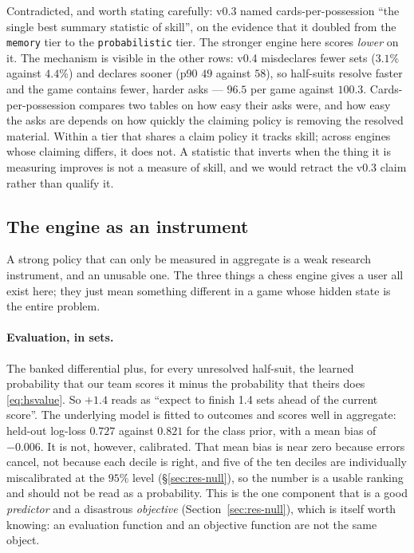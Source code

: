\documentclass[11pt,letterpaper]{article}
\begin{document}
Contradicted, and worth stating carefully: v0.3 named cards-per-possession
``the single best summary statistic of skill'', on the evidence that it doubled
from the \texttt{memory} tier to the \texttt{probabilistic} tier. The stronger
engine here scores \emph{lower} on it. The mechanism is visible in the other
rows: v0.4 misdeclares fewer sets ($3.1\%$ against $4.4\%$) and declares sooner (p90 $49$
against $58$), so half-suits resolve faster and the game contains fewer, harder
asks --- $96.5$ per game against $100.3$. Cards-per-possession compares two
tables on how easy their asks were, and how easy the asks are depends on how
quickly the claiming policy is removing the resolved material. Within a tier
that shares a claim policy it tracks skill; across engines whose claiming
differs, it does not. A statistic that inverts when the thing it is measuring
improves is not a measure of skill, and we would retract the v0.3 claim rather
than qualify it.

\subsection{The engine as an instrument}
\label{sec:engine}

A strong policy that can only be measured in aggregate is a weak research
instrument, and an unusable one. The three things a chess engine gives a user
all exist here; they just mean something different in a game whose hidden state
is the entire problem.

\paragraph{Evaluation, in sets.} The banked differential plus, for every
unresolved half-suit, the learned probability that our team scores it minus the
probability that theirs does \eqref{eq:hsvalue}. So $+1.4$ reads as ``expect to
finish 1.4 sets ahead of the current score''. The underlying model is fitted
to outcomes and scores well in aggregate: held-out log-loss $0.727$ against
$0.821$ for the class prior, with a mean bias of $-0.006$. It is not, however,
calibrated. That mean bias is near zero because errors cancel, not because
each decile is right, and five of the ten deciles are individually
miscalibrated at the $95\%$ level (\S\ref{sec:res-null}), so the number
is a usable ranking and should not be read as a probability. This is the one
component that is a
good \emph{predictor} and a disastrous \emph{objective}
(Section~\ref{sec:res-null}), which is itself worth knowing: an evaluation
function and an objective function are not the same object.
\end{document}
